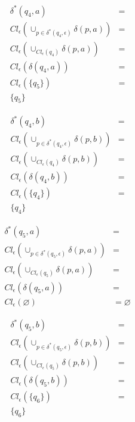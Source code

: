\documentclass{article}
\begin{document}
\begin{enumerate}
{\begin{enumerate}
{					\begin{align*}
					\delta^{*} (q_{4},a)&=\\
					Cl_{\epsilon} (\cup_{p \in \delta^{*} (q_{4}, \epsilon)}	\delta (p,a)) &=\\
					Cl_{\epsilon} (\cup_{Cl_{\epsilon} (q_{4})}	\delta (p,a)) &=\\
					Cl_{\epsilon} ( \delta(q_{4},a)) &=\\
					Cl_{\epsilon} (\{q_{5}\}) &=\\
					\{q_{5}\}
					\end{align*}
					
					\begin{align*}
					\delta^{*} (q_{4},b)&=\\
					Cl_{\epsilon} (\cup_{p \in \delta^{*} (q_{4}, \epsilon)}	\delta (p,b)) &=\\
					Cl_{\epsilon} (\cup_{Cl_{\epsilon} (q_{4})}	\delta (p,b)) &=\\
					Cl_{\epsilon} ( \delta(q_{4},b)) &=\\
					Cl_{\epsilon} (\{q_{4}\}) &=\\
					\{q_{4}\}
					\end{align*}
					
					\begin{align*}
					\delta^{*} (q_{5},a)&=\\
					Cl_{\epsilon} (\cup_{p \in \delta^{*} (q_{5}, \epsilon)}	\delta (p,a)) &=\\
					Cl_{\epsilon} (\cup_{Cl_{\epsilon} (q_{5})}	\delta (p,a)) &=\\
					Cl_{\epsilon} ( \delta(q_{5},a)) &=\\
					Cl_{\epsilon} (\varnothing) &=
					\varnothing
					\end{align*}
					
					\begin{align*}
					\delta^{*} (q_{5},b)&=\\
					Cl_{\epsilon} (\cup_{p \in \delta^{*} (q_{5}, \epsilon)}	\delta (p,b)) &=\\
					Cl_{\epsilon} (\cup_{Cl_{\epsilon} (q_{5})}	\delta (p,b)) &=\\
					Cl_{\epsilon} ( \delta(q_{5},b)) &=\\
					Cl_{\epsilon} (\{q_{6}\}) &=\\
					\{q_{6}\}
					\end{align*}
					
}
\end{enumerate}}
\end{enumerate}
\end{document}
